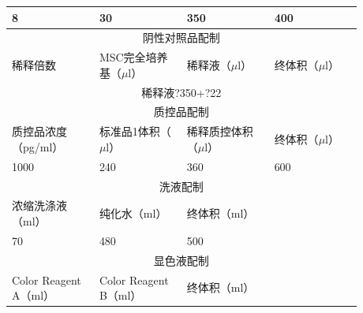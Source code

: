 \documentclass[UTF8,10pt,a4paper,fontset=fandol]{ctexart}
\newcommand{\fieldvalue}[1]{#1}
\newcommand{\handwritten}[1]{#1}
\begin{document}
\begin{tabular}{|p{0.22\linewidth}|p{0.22\linewidth}|p{0.22\linewidth}|p{0.22\linewidth}|}
\hline
\fieldvalue{\handwritten{8}} &
\fieldvalue{\handwritten{30}} &
\fieldvalue{\handwritten{350}} &
\fieldvalue{\handwritten{400}}\\
\hline
\multicolumn{4}{|c|}{阴性对照品配制}\\
\hline
稀释倍数 & MSC完全培养基（$\mu$l） & 稀释液（$\mu$l） & 终体积（$\mu$l）\\
\hline
\multicolumn{4}{|c|}{%
\fieldvalue{\handwritten{稀释液?350+?22}}}\\
\hline
\multicolumn{4}{|c|}{质控品配制}\\
\hline
质控品浓度（pg/ml） & 标准品1体积（$\mu$l） & 稀释质控体积（$\mu$l） & 终体积（$\mu$l）\\
\hline
\fieldvalue{\handwritten{1000}} &
\fieldvalue{\handwritten{240}} &
\fieldvalue{\handwritten{360}} &
\fieldvalue{\handwritten{600}}\\
\hline
\multicolumn{4}{|c|}{洗液配制}\\
\hline
浓缩洗涤液（ml） & 纯化水（ml） & 终体积（ml） & \\
\hline
\fieldvalue{\handwritten{70}} &
\fieldvalue{\handwritten{480}} &
\fieldvalue{\handwritten{500}} & \\
\hline
\multicolumn{4}{|c|}{显色液配制}\\
\hline
Color Reagent A（ml） & Color Reagent B（ml） & 终体积（ml） & \\
\hline

\end{tabular}
\end{document}
